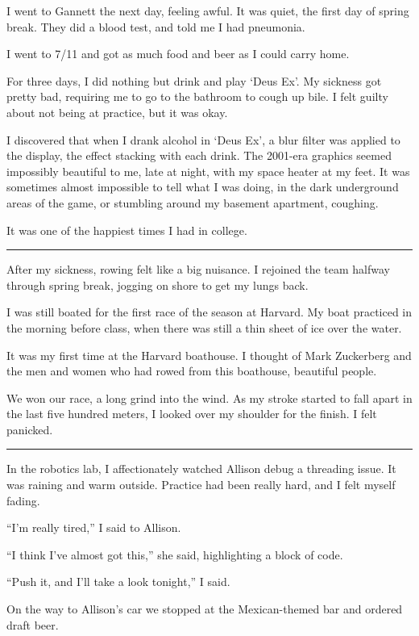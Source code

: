 I went to Gannett the next day, feeling awful.  It was quiet, the first day of
spring break.  They did a blood test, and told me I had pneumonia.

I went to 7/11 and got as much food and beer as I could carry home.

For three days, I did nothing but drink and play `Deus Ex'.  My sickness got
pretty bad, requiring me to go to the bathroom to cough up bile.  I felt guilty
about not being at practice, but it was okay.

I discovered that when I drank alcohol in `Deus Ex', a blur filter was applied
to the display, the effect stacking with each drink.  The 2001-era graphics
seemed impossibly beautiful to me, late at night, with my space heater at my
feet.  It was sometimes almost impossible to tell what I was doing, in the dark
underground areas of the game, or stumbling around my basement apartment,
coughing.

It was one of the happiest times I had in college.

\plainfancybreak{12pt}{2}{}

After my sickness, rowing felt like a big nuisance.  I rejoined the team halfway
through spring break, jogging on shore to get my lungs back.

I was still boated for the first race of the season at Harvard.  My boat
practiced in the morning before class, when there was still a thin sheet of ice
over the water.

It was my first time at the Harvard boathouse.  I thought of Mark Zuckerberg and
the men and women who had rowed from this boathouse, beautiful people.

We won our race, a long grind into the wind.  As my stroke started to fall apart
in the last five hundred meters, I looked over my shoulder for the finish.  I felt
panicked.

\plainfancybreak{12pt}{2}{}

In the robotics lab, I affectionately watched Allison debug a threading issue.
It was raining and warm outside.  Practice had been really hard, and I felt
myself fading.

``I'm really tired,'' I said to Allison.

``I think I've almost got this,'' she said, highlighting a block of code.

``Push it, and I'll take a look tonight,'' I said.

On the way to Allison's car we stopped at the Mexican-themed bar and ordered
draft beer.

